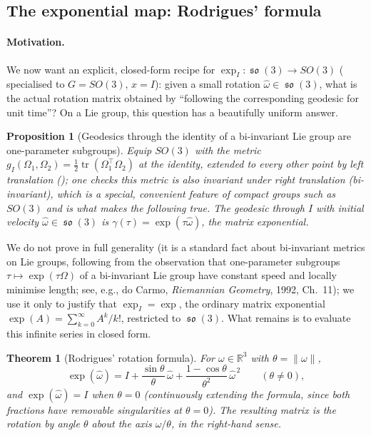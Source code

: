 \documentclass[11pt,a4paper]{report}
\newtheorem{theorem}{Theorem}[chapter]
\newtheorem{proposition}[proposition]{Proposition}
\theoremstyle{definition}
\theoremstyle{remark}
\DeclareMathOperator{\so}{\mathfrak{so}}
\DeclareMathOperator{\tr}{tr}
\newcommand{\RR}{\mathbb R}
\begin{document}
\subsection{The exponential map: Rodrigues' formula}
\label{sec:rodrigues-scratch}

\paragraph{Motivation.} We now want an explicit, closed-form recipe for
$\exp_I:\so(3)\to SO(3)$ ( specialised to $G=SO(3)$,
$x=I$): given a small rotation $\widehat\omega\in\so(3)$, what is the actual
rotation matrix obtained by ``following the corresponding geodesic for unit
time''? On a Lie group, this question has a beautifully uniform answer.

\begin{proposition}[Geodesics through the identity of a bi-invariant Lie group are one-parameter subgroups]
\label{prop:geodesic-oneparam}
Equip $SO(3)$ with the metric $g_I(\Omega_1,\Omega_2) = \tfrac12\tr(\Omega_1^\top\Omega_2)$
at the identity, extended to every other point by left translation
(); one checks this metric is also invariant
under \emph{right} translation (\emph{bi-invariant}), which is a special,
convenient feature of compact groups such as $SO(3)$ and is what makes the
following true. The geodesic through $I$ with initial velocity
$\widehat\omega\in\so(3)$ is $\gamma(\tau) = \exp(\tau\widehat\omega)$, the
matrix exponential.
\end{proposition}

We do not prove  in full generality (it is a
standard fact about bi-invariant metrics on Lie groups, following from the
observation that one-parameter subgroups $\tau\mapsto\exp(\tau\Omega)$ of a
bi-invariant Lie group have constant speed and locally minimise length; see,
e.g., do Carmo, \emph{Riemannian Geometry}, 1992, Ch.~11); we use it only to
justify that $\exp_I=\exp$, the ordinary matrix exponential
$\exp(A)=\sum_{k=0}^\infty A^k/k!$, restricted to $\so(3)$. What remains is
to evaluate this infinite series in closed form.

\begin{theorem}[Rodrigues' rotation formula]
\label{thm:rodrigues-scratch}
For $\omega\in\RR^3$ with $\theta=\|\omega\|$,
\[
\exp(\widehat\omega)
=
I + \frac{\sin\theta}{\theta}\,\widehat\omega + \frac{1-\cos\theta}{\theta^2}\,\widehat\omega^{\,2}
\qquad(\theta\ne0),
\]
and $\exp(\widehat\omega)=I$ when $\theta=0$ (continuously extending the
formula, since both fractions have removable singularities at $\theta=0$).
The resulting matrix is the rotation by angle $\theta$ about the axis
$\omega/\theta$, in the right-hand sense.
\end{theorem}
\end{document}
